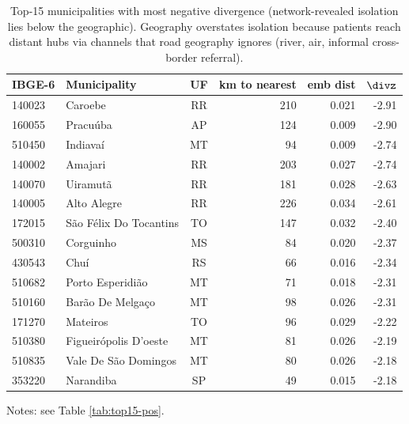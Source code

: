 \begin{table}[ht]
\centering
\caption{Top-15 municipalities with most negative divergence (network-revealed isolation lies below the geographic). Geography overstates isolation because patients reach distant hubs via channels that road geography ignores (river, air, informal cross-border referral).}
\label{tab:top15-neg}
\small
\begin{tabular}{llcrrr}
\toprule
IBGE-6 & Municipality & UF & km to nearest & emb dist & $\divz$ \\
\midrule
  140023 & Caroebe & RR & 210 & 0.021 & -2.91 \\
  160055 & Pracuúba & AP & 124 & 0.009 & -2.90 \\
  510450 & Indiavaí & MT & 94 & 0.009 & -2.74 \\
  140002 & Amajari & RR & 203 & 0.027 & -2.74 \\
  140070 & Uiramutã & RR & 181 & 0.028 & -2.63 \\
  140005 & Alto Alegre & RR & 226 & 0.034 & -2.61 \\
  172015 & São Félix Do Tocantins & TO & 147 & 0.032 & -2.40 \\
  500310 & Corguinho & MS & 84 & 0.020 & -2.37 \\
  430543 & Chuí & RS & 66 & 0.016 & -2.34 \\
  510682 & Porto Esperidião & MT & 71 & 0.018 & -2.31 \\
  510160 & Barão De Melgaço & MT & 98 & 0.026 & -2.31 \\
  171270 & Mateiros & TO & 96 & 0.029 & -2.22 \\
  510380 & Figueirópolis D'oeste & MT & 81 & 0.026 & -2.19 \\
  510835 & Vale De São Domingos & MT & 80 & 0.026 & -2.18 \\
  353220 & Narandiba & SP & 49 & 0.015 & -2.18 \\
\bottomrule
\end{tabular}
\medskip

\footnotesize
Notes: see Table \ref{tab:top15-pos}.
\end{table}
